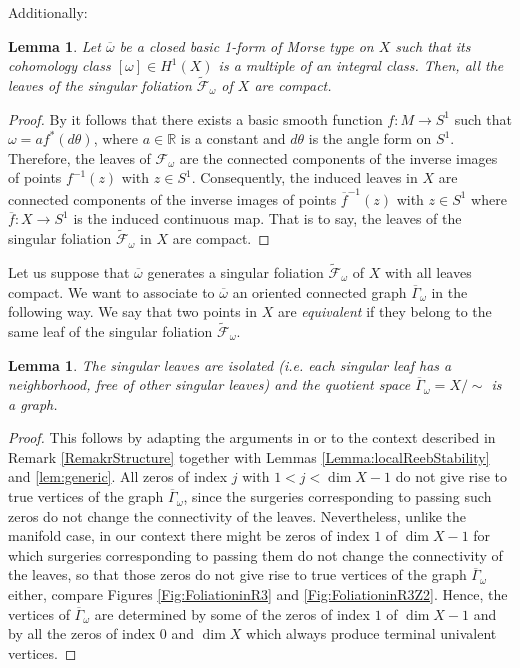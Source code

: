 \documentclass[
  a4paper, 
  reqno, 
  oneside, 
  12pt
]{amsart}
\newtheorem{lemma}[theorem]{Lemma}
\theoremstyle{definition}
\theoremstyle{remark}
\begin{document}
Additionally:

\begin{lemma}
Let $\overline{\omega}$ be a closed basic 1-form of Morse type on $X$ such that its cohomology class $[\omega]\in  H^1(X)$ is a multiple of an integral class. Then, all the leaves of the 
singular foliation $\tilde{\mathcal{F}}_\omega$ of $X$ are compact.
\end{lemma}

\begin{proof}
By \cite[Prop. 3.4]{V} it follows that there exists a basic smooth function $f:M\to S^1$ such that $\omega=af^{\ast}(d\theta)$, where $a\in \mathbb{R}$ is a constant and $d\theta$ is the angle form on $S^1$. Therefore, the leaves of $\mathcal{F}_\omega$ are the connected components of the inverse images of points $f^{-1}(z)$ with $z\in S^1$. Consequently, the induced leaves in $X$ are connected components of the inverse images of points $\overline{f}^{-1}(z)$ with $z\in S^1$ where $\overline{f}:X\to S^1$ is the induced continuous map. That is to say, the leaves of the singular foliation $\tilde{\mathcal{F}}_\omega$ in $X$ are compact. 
\end{proof}

Let us suppose that $\overline{\omega}$ generates a singular foliation $\tilde{\mathcal{F}}_\omega$ of $X$ with all leaves compact. We want to associate to $\overline{\omega}$ an oriented connected graph $\overline{\Gamma}_\omega$ in the following way. We say that two points in $X$ are \emph{equivalent} if they belong to the same leaf of the singular foliation $\tilde{\mathcal{F}}_\omega$.

\begin{lemma}\label{w-graph}
The singular leaves are isolated (i.e. each singular leaf has
a neighborhood, free of other singular leaves) and the quotient space $\overline{\Gamma}_\omega=X/\sim$ is a graph.
\end{lemma}
\begin{proof}
This follows by adapting the arguments in \cite[s. 5.2]{FKL} or \cite[step. (1)]{Honda} to the context described in Remark \ref{RemakrStructure} together with Lemmas \ref{Lemma:localReebStability} and \ref{lem:generic}. All zeros of index $j$ with $1<j<\dim X-1$ do not give rise to true vertices of the graph $\overline{\Gamma}_\omega$, since the surgeries corresponding to passing such zeros do not change the connectivity of the leaves. Nevertheless, unlike the manifold case, in our context there might be zeros of index $1$ of $\dim X-1$ for which surgeries corresponding to passing them do not change the connectivity of the leaves, so that those zeros do not give rise to true vertices of the graph $\overline{\Gamma}_\omega$ either, compare Figures \ref{Fig:FoliationinR3} and \ref{Fig:FoliationinR3Z2}. Hence, the vertices of $\overline{\Gamma}_\omega$ are determined by some of the zeros of index $1$ of $\dim X-1$ and by all the zeros of index $0$ and $\dim X$ which always produce terminal univalent vertices.
\end{proof}
\end{document}
